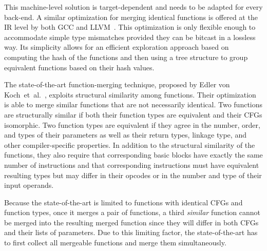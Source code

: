 This machine-level solution is target-dependent and needs to be adapted for every back-end.
A similar optimization for merging identical functions %
is offered at the IR level by both GCC and LLVM~\cite{llvm-fm,livska14}.
This optimization is only flexible enough to accommodate simple type mismatches
provided they can be bitcast in a lossless way.
Its simplicity allows for an efficient exploration approach based on computing
the hash of the functions and then using a tree structure to group equivalent
functions based on their hash values.

The state-of-the-art function-merging technique, proposed by Edler von
Koch~et~al.~\cite{edler14}, exploits structural similarity among functions.
Their optimization is able to merge similar functions that are not necessarily
identical.
Two functions are structurally similar if both their function types are equivalent
and their CFGs isomorphic.
Two function types are equivalent if they agree in the number, order, and types
of their parameters as well as
their return types, linkage type, and other compiler-specific properties.
In addition to the structural similarity of the functions, they also require
that corresponding basic blocks have exactly the same number of instructions
and that corresponding instructions must have equivalent resulting types but may
differ in their opcodes or in the number and type of their input operands.


Because the state-of-the-art is limited to functions with identical CFGs
and function types, once it merges a pair of functions, a third
\textit{similar} function cannot be merged into the resulting merged function
since they will differ in both CFGs and their lists of parameters.
Due to this limiting factor, the state-of-the-art has to first collect all
mergeable functions and merge them simultaneously.

